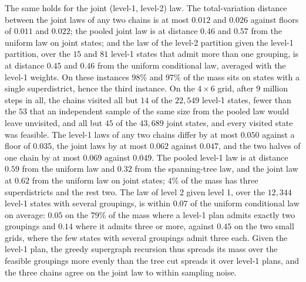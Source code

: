 \documentclass[preprint,12pt,authoryear]{elsarticle}
\theoremstyle{definition}
\begin{document}
The same holds for the joint (level-1, level-2) law. The total-variation distance between the joint laws of any two chains is at most $0.012$ and $0.026$ against floors of $0.011$ and $0.022$; the pooled joint law is at distance $0.46$ and $0.57$ from the uniform law on joint states; and the law of the level-2 partition given the level-1 partition, over the $15$ and $81$ level-1 states that admit more than one grouping, is at distance $0.45$ and $0.46$ from the uniform conditional law, averaged with the level-1 weights. On these instances $98\%$ and $97\%$ of the mass sits on states with a single superdistrict, hence the third instance. On the $4\times6$ grid, after $9$ million steps in all, the chains visited all but $14$ of the $22{,}549$ level-1 states, fewer than the $53$ that an independent sample of the same size from the pooled law would leave unvisited, and all but $45$ of the $43{,}689$ joint states, and every visited state was feasible. The level-1 laws of any two chains differ by at most $0.050$ against a floor of $0.035$, the joint laws by at most $0.062$ against $0.047$, and the two halves of one chain by at most $0.069$ against $0.049$. The pooled level-1 law is at distance $0.59$ from the uniform law and $0.32$ from the spanning-tree law, and the joint law at $0.62$ from the uniform law on joint states; $4\%$ of the mass has three superdistricts and the rest two. The law of level 2 given level 1, over the $12{,}344$ level-1 states with several groupings, is within $0.07$ of the uniform conditional law on average: $0.05$ on the $79\%$ of the mass where a level-1 plan admits exactly two groupings and $0.14$ where it admits three or more, against $0.45$ on the two small grids, where the few states with several groupings admit three each. Given the level-1 plan, the greedy supergraph recursion thus spreads its mass over the feasible groupings more evenly than the tree cut spreads it over level-1 plans, and the three chains agree on the joint law to within sampling noise.
\end{document}
